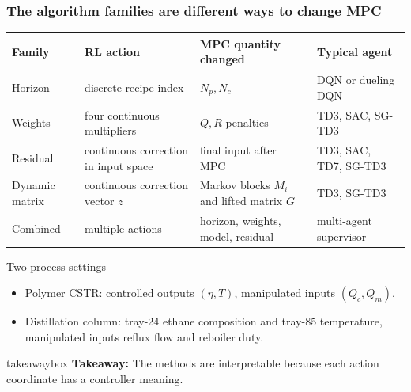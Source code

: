 \documentclass[aspectratio=169]{beamer}
\newcommand{\takeawaybox}[1]{%
\vspace{0.02cm}
\begin{center}
\begin{beamercolorbox}[wd=0.94\textwidth,sep=3pt,center,rounded=true,shadow=false]{takeawaybox}
\scriptsize
\textbf{\textcolor{maroon1}{Takeaway:}} #1
\end{beamercolorbox}
\end{center}
}
\begin{document}
\begin{frame}
\frametitle{\large \textbf{The algorithm families are different ways to change MPC}}
\scriptsize

\begin{center}
\tiny
\renewcommand{\arraystretch}{1.25}
\begin{tabular}{p{}p{}p{}p{}}
\toprule
\textbf{Family} & \textbf{RL action} & \textbf{MPC quantity changed} & \textbf{Typical agent}\\
\midrule
Horizon & discrete recipe index & \(N_p,N_c\) & DQN or dueling DQN\\
Weights & four continuous multipliers & \(Q,R\) penalties & TD3, SAC, SG-TD3\\
Residual & continuous correction in input space & final input after MPC & TD3, SAC, TD7, SG-TD3\\
Dynamic matrix & continuous correction vector \(z\) & Markov blocks \(M_i\) and lifted matrix \(G\) & TD3, SG-TD3\\
Combined & multiple actions & horizon, weights, model, residual & multi-agent supervisor\\
\bottomrule
\end{tabular}
\end{center}

\vspace{0.05cm}
\begin{block}{Two process settings}
\begin{itemize}\justifying
  \setlength\itemsep{0.25ex}
  \item Polymer CSTR: controlled outputs \((\eta,T)\), manipulated inputs \((Q_c,Q_m)\).
  \item Distillation column: tray-24 ethane composition and tray-85 temperature, manipulated inputs reflux flow and reboiler duty.
\end{itemize}
\end{block}

\takeawaybox{The methods are interpretable because each action coordinate has a controller meaning.}
\end{frame}
\end{document}
